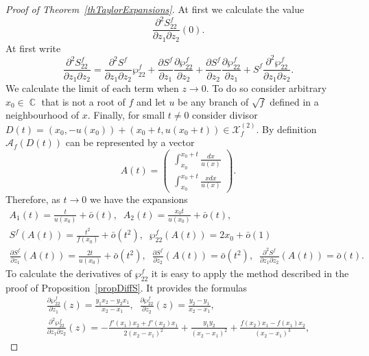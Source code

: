 \documentclass[10pt,a4paper]{amsart}
\DeclareMathOperator{\CC}{\mathbb C}
\begin{document}
	\begin{proof}[Proof of Theorem~\ref{thTaylorExpansions}]
		At first we calculate the value 
		\[
		\frac{\partial^2 S_{22}^f}{\partial z_1 \partial z_2}(0).
		\]
		At first write
		\begin{equation}\label{eqSecDer}
			\frac{\partial^2 S_{22}^f}{\partial z_1 \partial z_2} = \frac{\partial^2 S^f}{\partial z_1 \partial z_2}\wp_{22}^f + \frac{\partial S^f}{\partial z_1}\frac{\partial \wp_{22}^f}{\partial z_2} + \frac{\partial S^f}{\partial z_2}\frac{\partial \wp_{22}^f}{\partial z_1} + S^f\frac{\partial^2 \wp_{22}^f}{\partial z_1 \partial z_2}.
		\end{equation}
		We calculate the limit of each term when $z \to 0$. To do so
		consider arbitrary $x_0 \in \CC$ that is not a root of $f$ and let $u$ be any branch of $\sqrt{f}$ defined in a neighbourhood of $x$. Finally, for small $t \ne 0$ consider divisor $D(t) = (x_0, -u(x_0)) + (x_0 + t, u(x_0 + t)) \in \mathcal X_f^{(2)}$. By definition $\mathscr A_f(D(t))$ can be represented by a vector
		\[
		A(t) = \begin{pmatrix}
			\displaystyle\int_{x_0}^{x_0+t} \frac{dx}{u(x)} \\
			\displaystyle\int_{x_0}^{x_0+t} \frac{xdx}{u(x)}
		\end{pmatrix}.
		\]
		Therefore, as $t \to 0$ we have the expansions
		\[
		\begin{gathered}
			A_1(t) = \frac{t}{u(x_0)} + \bar{o}(t),\;\; A_2(t) = \frac{x_0 t}{u(x_0)} + \bar{o}(t),\\S^f(A(t)) = \frac{t^2}{f(x_0)} + \bar{o}(t^2),\;\;\wp_{22}^f(A(t)) = 2x_0 + \bar{o}(1)\\\frac{\partial S^f}{\partial z_1}(A(t)) = \frac{2t}{u(x_0)} + \bar{o}(t^2),\;\;\frac{\partial S^f}{\partial z_2}(A(t)) = \bar{o}(t^2),\;\;\frac{\partial^2 S^f}{\partial z_1\partial z_2}(A(t)) = \bar{o}(t).
		\end{gathered}
		\]
		To calculate the derivatives of $\wp_{22}^f$ it is easy to apply the method described in the proof of Proposition~\ref{propDiffS}. It provides the formulas
		\[
		\begin{gathered}
			\frac{\partial \wp_{22}^f}{\partial z_1}(z) = \frac{y_1x_2 - y_2x_1}{x_2 - x_1},\;\;\frac{\partial \wp_{22}^f}{\partial z_2}(z) = \frac{y_2 - y_1}{x_2 - x_1},\\
			\frac{\partial^2 \wp_{22}^f}{\partial z_1 \partial z_2}(z) = -\frac{f'(x_1)x_2 + f'(x_2)x_1}{2(x_2 - x_1)^2} + \frac{y_1y_2}{(x_2 - x_1)^2} + \frac{f(x_2)x_1 - f(x_1)x_2}{(x_2 - x_1)^3},

\end{gathered}\]
\end{proof}
\end{document}
